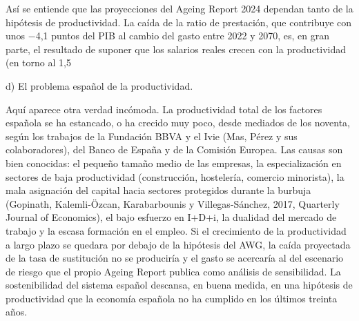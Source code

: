 \documentclass[10pt,a4paper]{article}
\begin{document}
Así se entiende que las proyecciones del Ageing Report 2024 dependan tanto de la hipótesis de productividad. La caída de la ratio de prestación, que contribuye con unos −4,1 puntos del PIB al cambio del gasto entre 2022 y 2070, es, en gran parte, el resultado de suponer que los salarios reales crecen con la productividad (en torno al 1,5%

d) El problema español de la productividad.

Aquí aparece otra verdad incómoda. La productividad total de los factores española se ha estancado, o ha crecido muy poco, desde mediados de los noventa, según los trabajos de la Fundación BBVA y el Ivie (Mas, Pérez y sus colaboradores), del Banco de España y de la Comisión Europea. Las causas son bien conocidas: el pequeño tamaño medio de las empresas, la especialización en sectores de baja productividad (construcción, hostelería, comercio minorista), la mala asignación del capital hacia sectores protegidos durante la burbuja (Gopinath, Kalemli-Özcan, Karabarbounis y Villegas-Sánchez, 2017, Quarterly Journal of Economics), el bajo esfuerzo en I+D+i, la dualidad del mercado de trabajo y la escasa formación en el empleo. Si el crecimiento de la productividad a largo plazo se quedara por debajo de la hipótesis del AWG, la caída proyectada de la tasa de sustitución no se produciría y el gasto se acercaría al del escenario de riesgo que el propio Ageing Report publica como análisis de sensibilidad. La sostenibilidad del sistema español descansa, en buena medida, en una hipótesis de productividad que la economía española no ha cumplido en los últimos treinta años.
\end{document}
